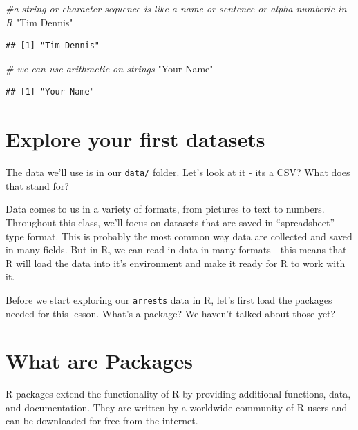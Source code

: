 \documentclass[]{book}
\newenvironment{Shaded}{\begin{snugshade}}{\end{snugshade}}
\newcommand{\CommentTok}[1]{\textcolor[rgb]{0.56,0.35,0.01}{\textit{#1}}}
\newcommand{\StringTok}[1]{\textcolor[rgb]{0.31,0.60,0.02}{#1}}
\begin{document}
\begin{Shaded}
\begin{Highlighting}[]
\CommentTok{#a string or character sequence is like a name or sentence or alpha numberic in R}
\StringTok{"Tim Dennis"}
\end{Highlighting}
\end{Shaded}

\begin{verbatim}
## [1] "Tim Dennis"
\end{verbatim}

\begin{Shaded}
\begin{Highlighting}[]
\CommentTok{# we can use arithmetic on strings}
\StringTok{"Your Name"}
\end{Highlighting}
\end{Shaded}

\begin{verbatim}
## [1] "Your Name"
\end{verbatim}

\hypertarget{arrests}{%
\section{Explore your first datasets}\label{arrests}}

The data we'll use is in our \texttt{data/} folder. Let's look at it - its a CSV? What does that stand for?

Data comes to us in a variety of formats, from pictures to text to numbers. Throughout this class, we'll focus on datasets that are saved in ``spreadsheet''-type format. This is probably the most common way data are collected and saved in many fields. But in R, we can read in data in many formats - this means that R will load the data into it's environment and make it ready for R to work with it.

Before we start exploring our \texttt{arrests} data in R, let's first load the packages needed for this lesson. What's a package? We haven't talked about those yet?

\hypertarget{what-are-packages}{%
\section{What are Packages}\label{what-are-packages}}

R packages extend the functionality of R by providing additional functions, data, and documentation. They are written by a worldwide community of R users and can be downloaded for free from the internet.
\end{document}
